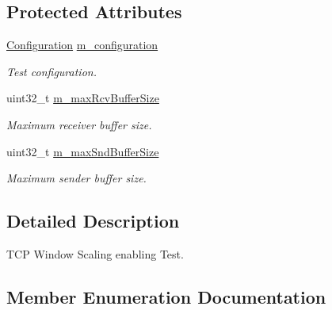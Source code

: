 \subsection*{Protected Attributes}
\begin{DoxyCompactItemize}
\item 
\hyperlink{classWScalingTestCase_a6b31fa8be505eaac47c2383fb17dc5fd}{Configuration} \hyperlink{classWScalingTestCase_a72831e1b3b682abc7055beee2e0022c1}{m\+\_\+configuration}
\begin{DoxyCompactList}\small\item\em Test configuration. \end{DoxyCompactList}\item 
uint32\+\_\+t \hyperlink{classWScalingTestCase_aab726a687911081a9ef7ef2d04fc7460}{m\+\_\+max\+Rcv\+Buffer\+Size}
\begin{DoxyCompactList}\small\item\em Maximum receiver buffer size. \end{DoxyCompactList}\item 
uint32\+\_\+t \hyperlink{classWScalingTestCase_ad67ac3c105f7b5d89576c941362e0083}{m\+\_\+max\+Snd\+Buffer\+Size}
\begin{DoxyCompactList}\small\item\em Maximum sender buffer size. \end{DoxyCompactList}\end{DoxyCompactItemize}


\subsection{Detailed Description}
T\+CP Window Scaling enabling Test. 

\subsection{Member Enumeration Documentation}
